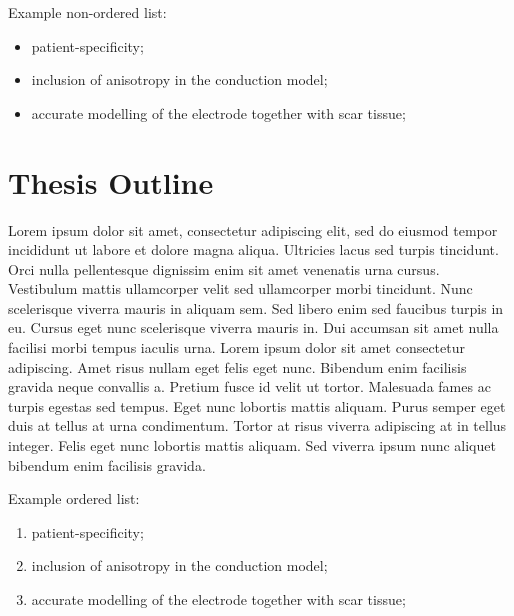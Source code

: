 Example non-ordered list:
\begin{itemize}
\item patient-specificity;
\item inclusion of anisotropy in the conduction model;
\item accurate modelling of the electrode together with scar tissue; 
\end{itemize}

\section{Thesis Outline}
Lorem ipsum dolor sit amet, consectetur adipiscing elit, sed do eiusmod tempor incididunt ut labore et dolore magna aliqua. Ultricies lacus sed turpis tincidunt. Orci nulla pellentesque dignissim enim sit amet venenatis urna cursus. Vestibulum mattis ullamcorper velit sed ullamcorper morbi tincidunt. Nunc scelerisque viverra mauris in aliquam sem. Sed libero enim sed faucibus turpis in eu. Cursus eget nunc scelerisque viverra mauris in. Dui accumsan sit amet nulla facilisi morbi tempus iaculis urna. Lorem ipsum dolor sit amet consectetur adipiscing. Amet risus nullam eget felis eget nunc. Bibendum enim facilisis gravida neque convallis a. Pretium fusce id velit ut tortor. Malesuada fames ac turpis egestas sed tempus. Eget nunc lobortis mattis aliquam. Purus semper eget duis at tellus at urna condimentum. Tortor at risus viverra adipiscing at in tellus integer. Felis eget nunc lobortis mattis aliquam. Sed viverra ipsum nunc aliquet bibendum enim facilisis gravida.

Example ordered list:
\begin{enumerate}
\item patient-specificity;
\item inclusion of anisotropy in the conduction model;
\item accurate modelling of the electrode together with scar tissue; 
\end{enumerate}
